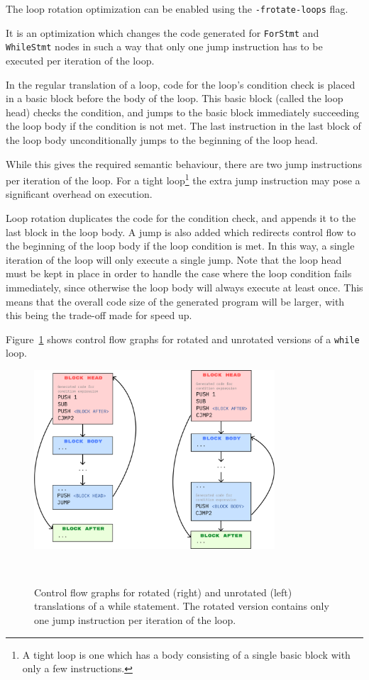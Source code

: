 \documentclass[11pt,a4paper]{scrartcl}
\begin{document}
The loop rotation optimization can be enabled using the \verb|-frotate-loops| flag.

It is an optimization which changes the code generated for \verb|ForStmt| and \verb|WhileStmt| nodes in such a way that only one jump instruction has to be executed per iteration of the loop.

In the regular translation of a loop, code for the loop's condition check is placed in a basic block before the body of the loop. This basic block (called the loop head) checks the condition, and jumps to the basic block immediately succeeding the loop body if the condition is not met. The last instruction in the last block of the loop body unconditionally jumps to the beginning of the loop head.

While this gives the required semantic behaviour, there are two jump instructions per iteration of the loop. For a tight loop\footnote{A tight loop is one which has a body consisting of a single basic block with only a few instructions.} the extra jump instruction may pose a significant overhead on execution.

Loop rotation duplicates the code for the condition check, and appends it to the last block in the loop body. A jump is also added which redirects control flow to the beginning of the loop body if the loop condition is met. In this way, a single iteration of the loop will only execute a single jump. Note that the loop head must be kept in place in order to handle the case where the loop condition fails immediately, since otherwise the loop body will always execute at least once. This means that the overall code size of the generated program will be larger, with this being the trade-off made for speed up.

Figure~\ref{fig:loop-rotation} shows control flow graphs for rotated and unrotated versions of a \verb|while| loop.

\begin{figure}
  \centering
  \includegraphics[width=0.8\textwidth]{loop_rotation}
  \caption{Control flow graphs for rotated (right) and unrotated (left) translations of a while statement. The rotated version contains only one jump instruction per iteration of the loop.}~\label{fig:loop-rotation}
\end{figure}
\end{document}
